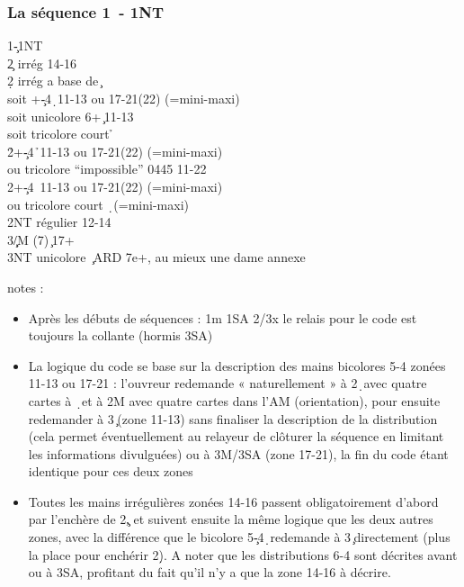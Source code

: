 \documentclass[a4paper]{article}
\begin{document}
\subsubsection{La séquence 1\pdfc\ - 1NT}

\begin{bidtable}
1\c-1NT\\
2\c \> irrég 14-16\\
2\d \> irrég a base de \c \+\\
soit +\c -4\d\ 11-13 ou 17-21(22) (=mini-maxi)\\
soit \> unicolore 6+\c\ 11-13\\
soit \> tricolore court \h \-\\
2\h {}+\c -4\h\ 11-13 ou 17-21(22) (=mini-maxi)\+\\
ou \> tricolore ``impossible'' 0445 11-22\-\\
2\s {}+\c -4\s\ 11-13 ou 17-21(22) (=mini-maxi)\+\\
ou \> tricolore court \d\ (=mini-maxi)\-\\
2NT \> régulier 12-14\\
3\c\d/M (7)\c\ 17+\\
3NT \> unicolore \c\ ARD 7e+, au mieux une dame annexe
\end{bidtable}

notes :

\begin{itemize}
\item Après les débuts de séquences :	1m	1SA	
	2/3x	le relais pour le code est toujours la collante (hormis 3SA)

\end{itemize}

\begin{itemize}
\item La logique du code se base sur la description des mains bicolores 5-4 zonées 11-13 ou 17-21 : 
  l’ouvreur redemande « naturellement » à 2\d\ avec quatre cartes à \d\ 
  et à 2M avec quatre cartes dans l’AM (orientation), pour ensuite redemander à 3\c\ (zone 11-13) sans finaliser la description de la distribution (cela permet éventuellement au relayeur de clôturer la séquence en limitant les informations divulguées)
  ou à 3M/3SA (zone 17-21), la fin du code étant identique pour ces deux zones

\end{itemize}

\begin{itemize}
\item Toutes les mains irrégulières zonées 14-16 passent obligatoirement d’abord par l’enchère de 2\c ,
et suivent ensuite la même logique que les deux autres zones,
avec la différence que le bicolore 5\c -4\d\ redemande à 3\c\ directement (plus la place pour enchérir 2\d ).
A noter que les distributions 6-4 sont décrites avant ou à 3SA, profitant du fait qu’il n’y a que la zone 14-16 à décrire.

\end{itemize}
\end{document}
